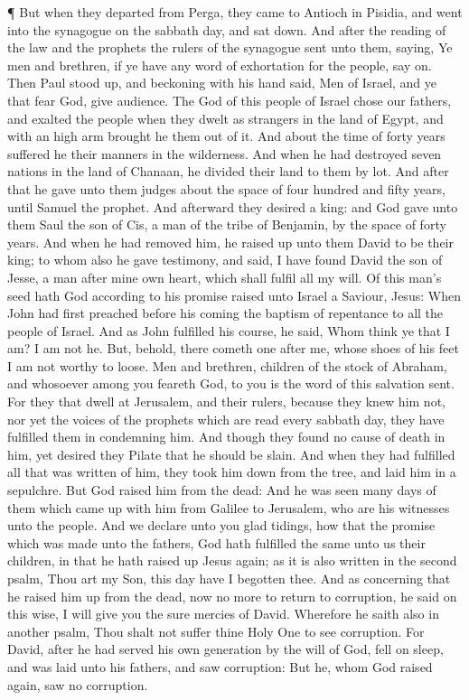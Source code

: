  ¶ But when they departed from Perga, they came to Antioch
in Pisidia, and went into the synagogue on the sabbath day, and sat
down.  And after the reading of the law and the prophets
the rulers of the synagogue sent unto them, saying, Ye men and brethren,
if ye have any word of exhortation for the people, say on. 
Then Paul stood up, and beckoning with his hand said, Men of Israel, and
ye that fear God, give audience.  The God of this people of
Israel chose our fathers, and exalted the people when they dwelt as
strangers in the land of Egypt, and with an high arm brought he them out
of it.  And about the time of forty years suffered he their
manners in the wilderness.  And when he had destroyed seven
nations in the land of Chanaan, he divided their land to them by lot.
 And after that he gave unto them judges about the space of
four hundred and fifty years, until Samuel the prophet. 
And afterward they desired a king: and God gave unto them Saul the son
of Cis, a man of the tribe of Benjamin, by the space of forty years.
 And when he had removed him, he raised up unto them David
to be their king; to whom also he gave testimony, and said, I have found
David the son of Jesse, a man after mine own heart, which shall fulfil
all my will.  Of this man's seed hath God according to his
promise raised unto Israel a Saviour, Jesus:  When John had
first preached before his coming the baptism of repentance to all the
people of Israel.  And as John fulfilled his course, he
said, Whom think ye that I am? I am not he. But, behold, there cometh
one after me, whose shoes of his feet I am not worthy to loose.
 Men and brethren, children of the stock of Abraham, and
whosoever among you feareth God, to you is the word of this salvation
sent.  For they that dwell at Jerusalem, and their rulers,
because they knew him not, nor yet the voices of the prophets which are
read every sabbath day, they have fulfilled them in condemning him.
 And though they found no cause of death in him, yet
desired they Pilate that he should be slain.  And when they
had fulfilled all that was written of him, they took him down from the
tree, and laid him in a sepulchre.  But God raised him from
the dead:  And he was seen many days of them which came up
with him from Galilee to Jerusalem, who are his witnesses unto the
people.  And we declare unto you glad tidings, how that the
promise which was made unto the fathers,  God hath
fulfilled the same unto us their children, in that he hath raised up
Jesus again; as it is also written in the second psalm, Thou art my Son,
this day have I begotten thee.  And as concerning that he
raised him up from the dead, now no more to return to corruption, he
said on this wise, I will give you the sure mercies of David.
 Wherefore he saith also in another psalm, Thou shalt not
suffer thine Holy One to see corruption.  For David, after
he had served his own generation by the will of God, fell on sleep, and
was laid unto his fathers, and saw corruption:  But he,
whom God raised again, saw no corruption.

